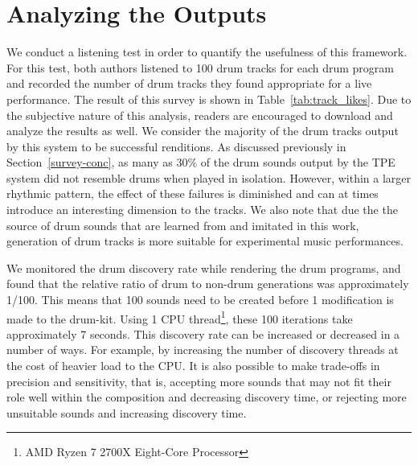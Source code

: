 \documentclass[\main/thesis.tex]{subfiles}
\begin{document}
\section{Analyzing the Outputs}
 We conduct a listening test in order to quantify the usefulness of this framework. For this test, both authors listened to 100 drum tracks for each drum program and recorded the number of drum tracks they found appropriate for a live performance. The result of this survey is shown in Table~\ref{tab:track_likes}. Due to the subjective nature of this analysis, readers are encouraged to download and analyze the results as well. We consider the majority of the drum tracks output by this system to be successful renditions. As discussed previously in Section~\ref{survey-conc}, as many as 30\% of the drum sounds output by the TPE system did not resemble drums when played in isolation. However, within a larger rhythmic pattern, the effect of these failures is diminished and can at times introduce an interesting dimension to the tracks. We also note that due the the source of drum sounds that are learned from and imitated in this work, generation of drum tracks is more suitable for experimental music performances.
 
  We monitored the drum discovery rate while rendering the drum programs, and found that the relative ratio of drum to non-drum generations was approximately 1/100. This means that 100 sounds need to be created before 1 modification is made to the drum-kit. Using 1 CPU thread\footnote{AMD Ryzen 7 2700X Eight-Core Processor}, these 100 iterations take approximately 7 seconds. This discovery rate can be increased or decreased in a number of ways. For example, by increasing the number of discovery threads at the cost of heavier load to the CPU. It is also possible to make trade-offs in precision and sensitivity, that is, accepting more sounds that may not fit their role well within the composition and decreasing discovery time, or rejecting more unsuitable sounds and increasing discovery time. 
\begin{table}[tbp]
\caption{\label{tab:track_likes} Measuring the quality of generated drum tracks}
\end{table}
\end{document}
